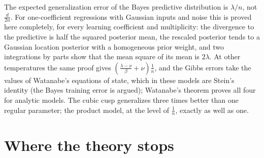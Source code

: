 \begin{refsection}
The expected generalization error of the Bayes predictive distribution is $\lambda/n$, not $\frac d{2n}$. For one-coefficient regressions with Gaussian inputs and noise this is proved here completely, for every learning coefficient and multiplicity: the divergence to the predictive is half the squared posterior mean, the rescaled posterior tends to a Gaussian location posterior with a homogeneous prior weight, and two integrations by parts show that the mean square of its mean is $2\lambda$. At other temperatures the same proof gives $(\frac{\lambda-\nu}\beta+\nu)\frac1n$, and the Gibbs errors take the values of Watanabe's equations of state, which in these models are Stein's identity (the Bayes training error is argued); Watanabe's theorem proves all four for analytic models. The cubic cusp generalizes three times better than one regular parameter; the product model, at the level of $\frac1n$, exactly as well as one.


\section{Where the theory stops}\label{sec:generalization:stops}


\end{refsection}
